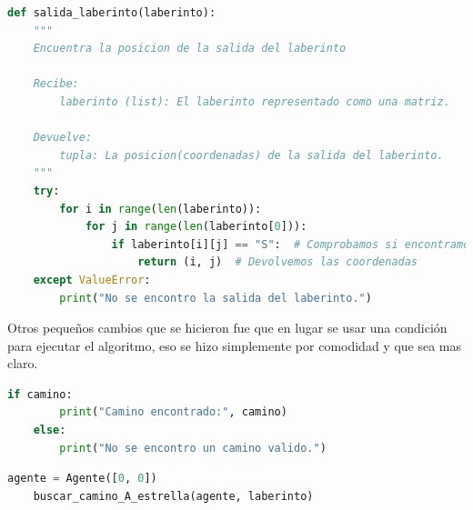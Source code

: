 \begin{lstlisting}[language=Python, caption=Función auxiliar: salidalaberinto]
    def salida_laberinto(laberinto):
    """
    Encuentra la posicion de la salida del laberinto

    Recibe:
        laberinto (list): El laberinto representado como una matriz.

    Devuelve:
        tupla: La posicion(coordenadas) de la salida del laberinto.
    """
    try:
        for i in range(len(laberinto)):
            for j in range(len(laberinto[0])):
                if laberinto[i][j] == "S":  # Comprobamos si encontramos la salida
                    return (i, j)  # Devolvemos las coordenadas 
    except ValueError:
        print("No se encontro la salida del laberinto.")
\end{lstlisting}

Otros pequeños cambios que se hicieron fue que en lugar se usar una condición para ejecutar 
el algoritmo, eso se hizo simplemente por comodidad y que sea mas claro.

\begin{lstlisting}[language=Python, caption=Versión 1: ejecución algoritmo]
	if camino:
    	print("Camino encontrado:", camino)
	else:
    	print("No se encontro un camino valido.")
\end{lstlisting}

\begin{lstlisting}[language=Python, caption=Versión 2: ejecución algoritmo]
	agente = Agente([0, 0])
	buscar_camino_A_estrella(agente, laberinto)
\end{lstlisting}

